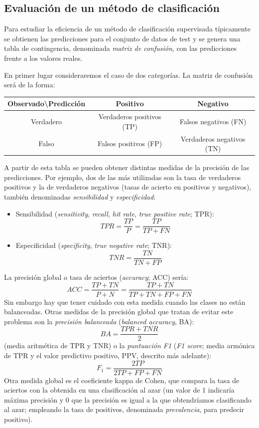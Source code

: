 \documentclass[]{book}
\theoremstyle{break}
\theoremstyle{definition}
\theoremstyle{definition}
\theoremstyle{definition}
\theoremstyle{remark}
\begin{document}
\subsection{Evaluación de un método de clasificación}\label{eval-class}

Para estudiar la eficiencia de un método de clasificación supervisada
típicamente se obtienen las predicciones para el conjunto de datos de
test y se genera una tabla de contingencia, denominada \emph{matriz de
confusión}, con las predicciones frente a los valores reales.

En primer lugar consideraremos el caso de dos categorías. La matriz de
confusión será de la forma:

\begin{longtable}[]{@{}ccc@{}}
\toprule
Observado\textbackslash{}Predicción & Positivo & Negativo\tabularnewline
\midrule
\endhead
Verdadero & Verdaderos positivos (TP) & Falsos negativos
(FN)\tabularnewline
Falso & Falsos positivos (FP) & Verdaderos negativos (TN)\tabularnewline
\bottomrule
\end{longtable}

A partir de esta tabla se pueden obtener distintas medidas de la
precisión de las predicciones. Por ejemplo, dos de las más utilizadas
son la tasa de verdaderos positivos y la de verdaderos negativos (tasas
de acierto en positivos y negativos), también denominadas
\emph{sensibilidad} y \emph{especificidad}:

\begin{itemize}
\item
  Sensibilidad (\emph{sensitivity}, \emph{recall}, \emph{hit rate},
  \emph{true positive rate}; TPR):
  \[TPR = \frac{TP}{P} = \frac{TP}{TP+FN}\]
\item
  Especificidad (\emph{specificity}, \emph{true negative rate}; TNR):
  \[TNR = \frac{TN}{TN+FP}\]
\end{itemize}

La precisión global o tasa de aciertos (\emph{accuracy}; ACC) sería:
\[ACC = \frac{TP + TN}{P + N} = \frac{TP+TN}{TP+TN+FP+FN}\] Sin embargo
hay que tener cuidado con esta medida cuando las clases no están
balanceadas. Otras medidas de la precisión global que tratan de evitar
este problema son la \emph{precisión balanceada} (\emph{balanced
accuracy}, BA): \[BA = \frac{TPR + TNR}{2}\] (media aritmética de TPR y
TNR) o la \emph{puntuación F1} (\emph{F1 score}; media armónica de TPR y
el valor predictivo positivo, PPV, descrito más adelante):
\[F_1 = \frac{2TP}{2TP+FP+FN}\] Otra medida global es el coeficiente
kappa de Cohen, que compara la tasa de aciertos con la obtenida en una
clasificación al azar (un valor de 1 indicaría máxima precisión y 0 que
la precisión es igual a la que obtendríamos clasificando al azar;
empleando la tasa de positivos, denominada \emph{prevalencia}, para
predecir positivo).
\end{document}
